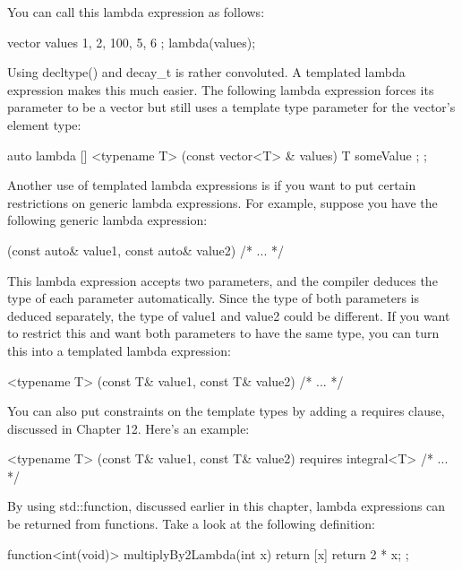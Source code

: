 You can call this lambda expression as follows:

\begin{cpp}
vector values { 1, 2, 100, 5, 6 };
lambda(values);
\end{cpp}

Using decltype() and decay\_t is rather convoluted. A templated lambda expression makes this much easier. The following lambda expression forces its parameter to be a vector but still uses a template type parameter for the vector’s element type:

\begin{cpp}
auto lambda { [] <typename T> (const vector<T> & values) {
        T someValue { };
} };
\end{cpp}

Another use of templated lambda expressions is if you want to put certain restrictions on generic lambda expressions. For example, suppose you have the following generic lambda expression:

\begin{cpp}
[](const auto& value1, const auto& value2) { /* ... */ }
\end{cpp}

This lambda expression accepts two parameters, and the compiler deduces the type of each parameter automatically. Since the type of both parameters is deduced separately, the type of value1 and value2 could be different. If you want to restrict this and want both parameters to have the same type, you can turn this into a templated lambda expression:

\begin{cpp}
[] <typename T> (const T& value1, const T& value2) { /* ... */ }
\end{cpp}

You can also put constraints on the template types by adding a requires clause, discussed in Chapter 12. Here’s an example:

\begin{cpp}
[] <typename T> (const T& value1, const T& value2) requires integral<T> {/* ... */}
\end{cpp}


By using std::function, discussed earlier in this chapter, lambda expressions can be returned from functions. Take a look at the following definition:

\begin{cpp}
function<int(void)> multiplyBy2Lambda(int x)
{
    return [x]{ return 2 * x; };
}
\end{cpp}

